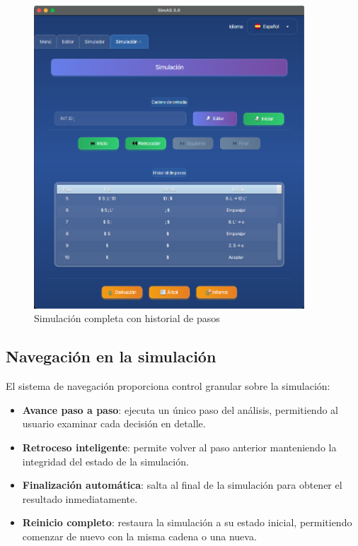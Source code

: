 \needspace{8cm}
\begin{figure}[H]
    \centering
    \includegraphics[width=0.9\textwidth]{figuras/simulador/simulacion_completa.png}
    \caption{Simulación completa con historial de pasos}
    \label{fig:simulacion_completa}
\end{figure}

\subsection{Navegación en la simulación}

El sistema de navegación proporciona control granular sobre la simulación:

\begin{itemize}
    \item \textbf{Avance paso a paso}: ejecuta un único paso del análisis, permitiendo al usuario examinar cada decisión en detalle.
    \item \textbf{Retroceso inteligente}: permite volver al paso anterior manteniendo la integridad del estado de la simulación.
    \item \textbf{Finalización automática}: salta al final de la simulación para obtener el resultado inmediatamente.
    \item \textbf{Reinicio completo}: restaura la simulación a su estado inicial, permitiendo comenzar de nuevo con la misma cadena o una nueva.
\end{itemize}

